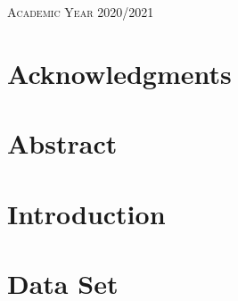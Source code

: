 \documentclass[a4paper,12pt,twoside]{report}
\begin{document}
\begin{onehalfspace}
\begin{titlepage}
\begin{center}
\textsc{Academic Year 2020/2021}\\[0.25cm] %

\vfill

\end{center}
\end{titlepage}

\clearpage
	\fancyhf{}
	\rhead{\thepage}
\chapter*{Acknowledgments}
\label{c:ack}





\clearpage
	\fancyhf{}
	\rhead{\thepage}
	\lhead{\textbf{ \nouppercase{\leftmark}} }
\tableofcontents

\clearpage
{}
\listoffigures

\clearpage
{}
\listoftables

\clearpage
	\fancyhf{}
	\rhead{\thepage}
\chapter*{Abstract}
\label{c:abstract}



\clearpage
	\fancyhf{}
	\rhead{\thepage}
	\lhead{\nouppercase{\leftmark}}
\chapter{Introduction}
\label{c:intro}




\clearpage
\chapter{Data Set}
\label{c:dataset}


\clearpage

\end{onehalfspace}
\end{document}

